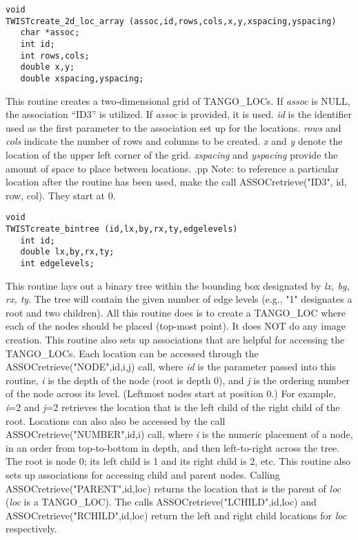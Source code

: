 \vspace{1em} 
\begin{verbatim} 
void 
TWISTcreate_2d_loc_array (assoc,id,rows,cols,x,y,xspacing,yspacing)
   char *assoc;
   int id;
   int rows,cols;
   double x,y;
   double xspacing,yspacing;
\end{verbatim}
This routine creates a two-dimensional grid of TANGO\_LOCs.  If {\em assoc} is
NULL, the association ``ID3'' is utilized.  If {\em assoc} is provided, it is
used.  {\em id} is the identifier used as the first parameter to the
association set up for the locations.  {\em rows} and {\em cols} indicate the
number of rows and columns to be created.  {\em x} and {\em y} denote the
location of the upper left corner of the grid.  {\em xspacing} and
{\em yspacing} provide the amount of space to place between locations.
.pp
Note:  to reference a particular location after the routine has been used,
make the call ASSOCretrieve("ID3", id, row, col).  They start at 0.

\vspace{1em}
\begin{verbatim}
void
TWISTcreate_bintree (id,lx,by,rx,ty,edgelevels) 
   int id;
   double lx,by,rx,ty;
   int edgelevels;
\end{verbatim}
This routine lays out a binary tree within the bounding box designated by
{\em lx, by, rx, ty}.  The tree will contain the given number of edge levels
(e.g., "1" designates a root and two children).  All this routine does is to
create a TANGO\_LOC where each of the nodes should be placed (top-most point).
It does NOT do any image creation.  This routine also sets up associations
that are helpful for accessing the TANGO\_LOCs.  Each location can be accessed
through the ASSOCretrieve("NODE",id,i,j) call, where {\em id} is the parameter
passed into this routine, {\em i} is the depth of the node (root is depth 0),
and {\em j} is the ordering number of the node across its level.  (Leftmost
nodes start at position 0.)  For example, {\em i}=2 and {\em j}=2 retrieves
the location that is the left child of the right child of the root.  Locations
can also also be accessed by the call ASSOCretrieve("NUMBER",id,i) call, where
{\em i} is the numeric placement of a node, in an order from
top-to-bottom in depth, and then left-to-right across the tree.  The
root is node 0; its left child is 1 and its right child is 2, etc. 
This routine
also sets up associations for accessing child and parent nodes.  Calling
ASSOCretrieve("PARENT",id,loc) returns the location that is the parent of
{\em loc} ({\em loc} is a TANGO\_LOC).  The calls
ASSOCretrieve("LCHILD",id,loc) and ASSOCretrieve("RCHILD",id,loc) return the
left and right child locations for {\em loc} respectively.

